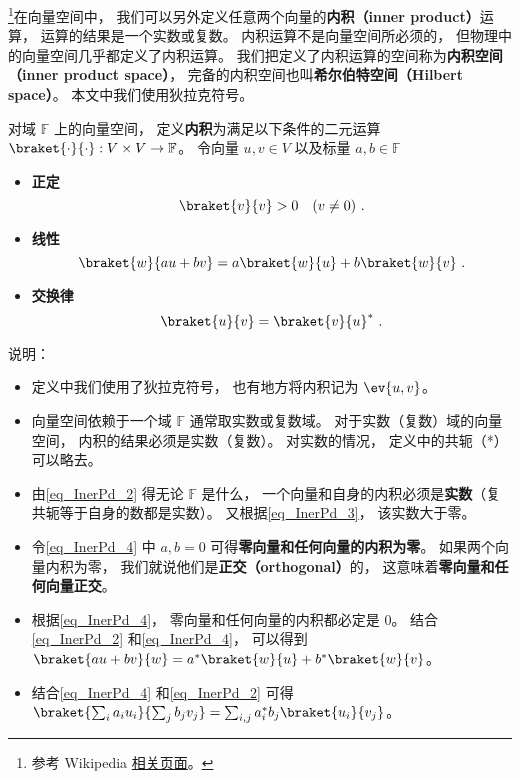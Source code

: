 


\footnote{参考 Wikipedia \href{https://en.wikipedia.org/wiki/Inner_product_space}{相关页面}。}在向量空间中， 我们可以另外定义任意两个向量的\textbf{内积（inner product）}运算， 运算的结果是一个实数或复数。 内积运算不是向量空间所必须的， 但物理中的向量空间几乎都定义了内积运算。 我们把定义了内积运算的空间称为\textbf{内积空间（inner product space）}， 完备的内积空间也叫\textbf{希尔伯特空间（Hilbert space）}。 本文中我们使用狄拉克符号。

\begin{definition}{}
对域 $\mathbb F$ 上的向量空间， 定义\textbf{内积}为满足以下条件的二元运算 $\braket{\cdot}{\cdot}: V\times V\to \mathbb F$。 令向量 $u, v\in V$ 以及标量 $a, b \in \mathbb F$
\begin{itemize}
\item \textbf{正定}
\begin{equation}\label{eq_InerPd_3}
\braket{v}{v} > 0 \quad (v \ne 0)~.
\end{equation}
\item \textbf{线性}
\begin{equation}\label{eq_InerPd_4}
\braket{w}{a u + b v} = a\braket{w}{u} + b\braket{w}{v}~.
\end{equation}
\item \textbf{交换律}
\begin{equation}\label{eq_InerPd_2}
\braket{u}{v} = \braket{v}{u}^*~.
\end{equation}
\end{itemize}
\end{definition}
说明：
\begin{itemize}
\item 定义中我们使用了狄拉克符号， 也有地方将内积记为 $\ev{u, v}$。
\item 向量空间依赖于一个域 $\mathbb F$ 通常取实数或复数域。 对于实数（复数）域的向量空间， 内积的结果必须是实数（复数）。 对实数的情况， 定义中的共轭（*）可以略去。
\item 由\autoref{eq_InerPd_2}  得无论 $\mathbb F$ 是什么， 一个向量和自身的内积必须是\textbf{实数}（复共轭等于自身的数都是实数）。 又根据\autoref{eq_InerPd_3}， 该实数大于零。
\item 令\autoref{eq_InerPd_4} 中 $a,b= 0$ 可得\textbf{零向量和任何向量的内积为零}。 如果两个向量内积为零， 我们就说他们是\textbf{正交（orthogonal）}的， 这意味着\textbf{零向量和任何向量正交}。
\item 根据\autoref{eq_InerPd_4}， 零向量和任何向量的内积都必定是 0。 结合\autoref{eq_InerPd_2} 和\autoref{eq_InerPd_4}， 可以得到 $\braket{a u + b v}{w} = a^*\braket{w}{u} + b^*\braket{w}{v}$。
\item 结合\autoref{eq_InerPd_4} 和\autoref{eq_InerPd_2} 可得 $\braket{\sum_i a_i u_i}{\sum_j b_j v_j} = \sum_{i,j} a_i^* b_j \braket{u_i}{v_j}$。
\end{itemize}

